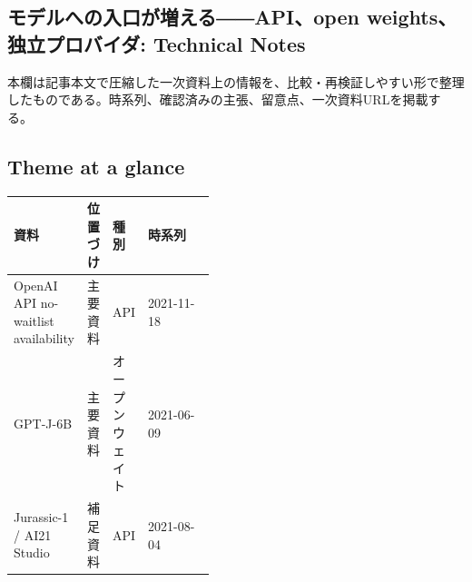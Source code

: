 \subsection*{モデルへの入口が増える――API、open weights、独立プロバイダ: Technical Notes}
本欄は記事本文で圧縮した一次資料上の情報を、比較・再検証しやすい形で整理したものである。時系列、確認済みの主張、留意点、一次資料URLを掲載する。
\smallskip
{}\par
\medskip
\subsection*{Theme at a glance}
\begin{center}
\footnotesize
\begin{tabularx}{\linewidth}{@{}p{0.20\linewidth}p{0.10\linewidth}p{0.14\linewidth}X@{}}
\toprule
資料 & 位置づけ & 種別 & 時系列 \\
\midrule
OpenAI API no-waitlist availability & 主要資料 & API & 2021-11-18 \\
GPT-J-6B & 主要資料 & オープンウェイト & 2021-06-09 \\
Jurassic-1 / AI21 Studio & 補足資料 & API & 2021-08-04 \\
\bottomrule
\end{tabularx}
\end{center}
\normalsize

